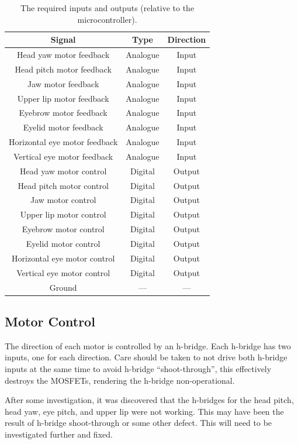 \documentclass[12pt]{article} %
\begin{document}
\begin{table}[h]
	\caption{The required inputs and outputs (relative to the microcontroller).}
	\centering
	\begin{tabular}{ |c|c|c| }
		\hline
		\textbf{Signal} & \textbf{Type} & \textbf{Direction} \\
		\hline
		Head yaw motor feedback & Analogue & Input \\
		Head pitch motor feedback & Analogue & Input \\
		Jaw motor feedback & Analogue & Input \\
		Upper lip motor feedback & Analogue & Input \\
		Eyebrow motor feedback & Analogue & Input \\
		Eyelid motor feedback & Analogue & Input \\
		Horizontal eye motor feedback & Analogue & Input \\
		Vertical eye motor feedback & Analogue & Input \\
		Head yaw motor control & Digital & Output \\
		Head pitch motor control & Digital & Output \\
		Jaw motor control & Digital & Output \\
		Upper lip motor control & Digital & Output \\
		Eyebrow motor control & Digital & Output \\
		Eyelid motor control & Digital & Output \\
		Horizontal eye motor control & Digital & Output \\
		Vertical eye motor control & Digital & Output \\
		Ground & --- & --- \\
		\hline
	\end{tabular}
	\label{tab:gpio}
\end{table}

\subsection{Motor Control}

The direction of each motor is controlled by an h-bridge.
Each h-bridge has two inputs, one for each direction.
Care should be taken to not drive both h-bridge inputs at the same time to avoid h-bridge ``shoot-through'', this effectively destroys the MOSFETs, rendering the h-bridge non-operational.

After some investigation, it was discovered that the h-bridges for the head pitch, head yaw, eye pitch, and upper lip were not working.
This may have been the result of h-bridge shoot-through or some other defect.
This will need to be investigated further and fixed.
\end{document}
